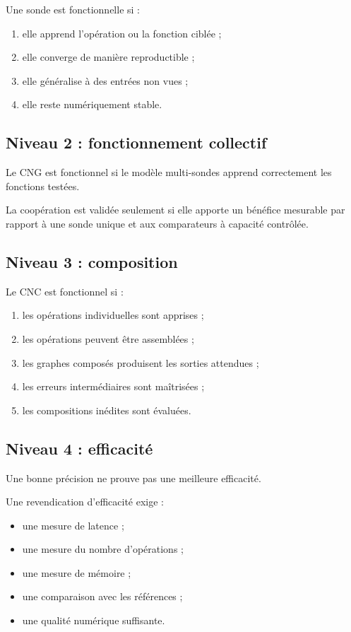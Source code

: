 \documentclass[11pt,a4paper]{article}
\begin{document}
Une sonde est fonctionnelle si :
\begin{enumerate}
    \item elle apprend l'opération ou la fonction ciblée ;
    \item elle converge de manière reproductible ;
    \item elle généralise à des entrées non vues ;
    \item elle reste numériquement stable.
\end{enumerate}

\subsection{Niveau 2 : fonctionnement collectif}

Le CNG est fonctionnel si le modèle multi-sondes
apprend correctement les fonctions testées.

La coopération est validée seulement si elle apporte
un bénéfice mesurable par rapport à une sonde unique
et aux comparateurs à capacité contrôlée.

\subsection{Niveau 3 : composition}

Le CNC est fonctionnel si :
\begin{enumerate}
    \item les opérations individuelles sont apprises ;
    \item les opérations peuvent être assemblées ;
    \item les graphes composés produisent les sorties attendues ;
    \item les erreurs intermédiaires sont maîtrisées ;
    \item les compositions inédites sont évaluées.
\end{enumerate}

\subsection{Niveau 4 : efficacité}

Une bonne précision ne prouve pas une meilleure efficacité.

Une revendication d'efficacité exige :
\begin{itemize}
    \item une mesure de latence ;
    \item une mesure du nombre d'opérations ;
    \item une mesure de mémoire ;
    \item une comparaison avec les références ;
    \item une qualité numérique suffisante.
\end{itemize}
\end{document}
